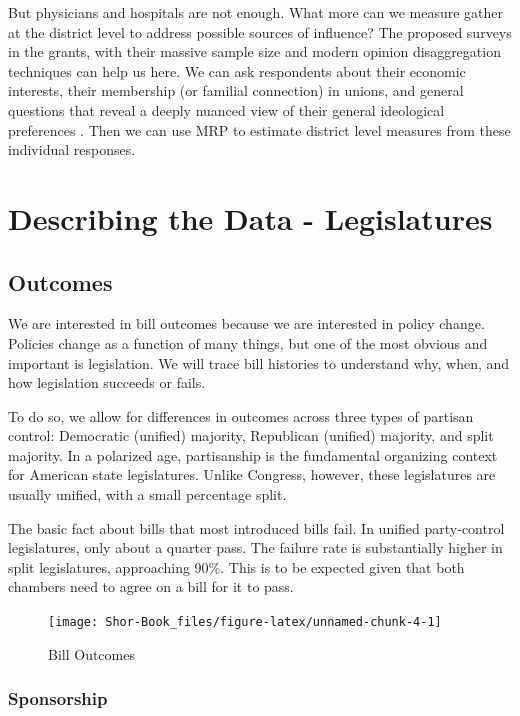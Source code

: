 \documentclass[
  oneside]{book}
\begin{document}
But physicians and hospitals are not enough. What more can we measure gather at the district level to address possible sources of influence? The proposed surveys in the grants, with their massive sample size and modern opinion disaggregation techniques can help us here. We can ask respondents about their economic interests, their membership (or familial connection) in unions, and general questions that reveal a deeply nuanced view of their general ideological preferences \citep{Jessee:2012, ShorRogowski:2018}. Then we can use MRP to estimate district level measures from these individual responses.

\hypertarget{describing-the-data---legislatures}{%
\chapter{Describing the Data - Legislatures}\label{describing-the-data---legislatures}}

\hypertarget{outcomes}{%
\section{Outcomes}\label{outcomes}}

We are interested in bill outcomes because we are interested in policy change. Policies change as a function of many things, but one of the most obvious and important is legislation. We will trace bill histories to understand why, when, and how legislation succeeds or fails.

To do so, we allow for differences in outcomes across three types of partisan control: Democratic (unified) majority, Republican (unified) majority, and split majority. In a polarized age, partisanship is the fundamental organizing context for American state legislatures. Unlike Congress, however, these legislatures are usually unified, with a small percentage split.

The basic fact about bills that most introduced bills fail. In unified party-control legislatures, only about a quarter pass. The failure rate is substantially higher in split legislatures, approaching 90\%. This is to be expected given that both chambers need to agree on a bill for it to pass.

\begin{figure}
\texttt{[image: Shor-Book\_files/figure-latex/unnamed-chunk-4-1]} \caption{Bill Outcomes}\label{fig:unnamed-chunk-4}
\end{figure}

\hypertarget{sponsorship}{%
\subsection{Sponsorship}\label{sponsorship}}
\end{document}
